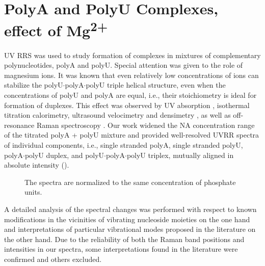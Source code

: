 \section[\texorpdfstring{%
    PolyA and PolyU Complexes, effect of Mg\textsuperscript{2+}
}{%
    PolyA and PolyU Complexes, effect of
		Mg\texttwosuperior\textplussuperior
}]{%
    PolyA and PolyU Complexes, effect of Mg\textsuperscript{2+}
}%

UV RRS was used to study formation of complexes in mixtures of complementary
polynucleotides, polyA and polyU.
Special attention was given to the role of magnesium ions.
It was known that even relatively low concentrations of 
ions can stabilize the polyU$\cdot$polyA$\cdot$polyU triple helical structure,
even when the concentrations of polyU and polyA are equal, i.e., their
stoichiometry is ideal for formation of duplexes.
This effect was observed by UV absorption
\parencite{%
	Kankia2003,%
	Sorokin2003%
},
isothermal titration calorimetry, ultrasound velocimetry and densimetry
\parencite{Kankia2003},
as well as off-resonance Raman spectroscopy
\parencite{Herrera2010}.
Our work widened the NA concentration range of the  titrated
polyA + polyU mixture and provided well-resolved UVRR spectra of individual
components, i.e., single stranded polyA, single stranded polyU,
polyA$\cdot$polyU duplex, and polyU$\cdot$polyA$\cdot$polyU triplex, mutually
aligned in absolute intensity
().

\begin{figure}[p]
	\centering
	
	\caption[%
		Resonance Raman spectra (244\,nm excitation) of polyA, polyU and
		their 1:1 and 1:2 mixtures in aqueous solution.
	]{%
		The spectra are normalized to the same concentration of phosphate units.
	}
	\label{\figlabel{rna_triplex:spectra}}
\end{figure}

A detailed analysis of the spectral changes was performed with respect to known
modifications in the vicinities of vibrating nucleoside moieties on the one
hand and interpretations of particular vibrational modes proposed in the
literature on the other hand.
Due to the reliability of both the Raman band positions and intensities in our
spectra, some interpretations found in the literature were confirmed and others
excluded.

